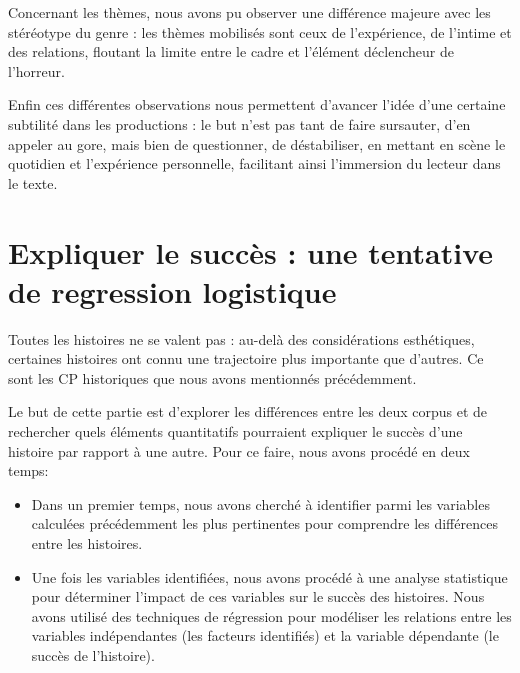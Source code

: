 \documentclass[12pt,a4paper,oneside,titlepage]{book} %
\begin{document}
\par Concernant les thèmes, nous avons pu observer une différence majeure avec les stéréotype du genre : les thèmes mobilisés sont ceux de l'expérience, de l'intime et des relations, floutant la limite entre le cadre et l'élément déclencheur de l'horreur.

\par Enfin ces différentes observations nous permettent d'avancer l'idée d'une certaine subtilité dans les productions : le but n'est pas tant de faire sursauter, d'en appeler au gore, mais bien de questionner, de déstabiliser, en mettant en scène le quotidien et l'expérience personnelle, facilitant ainsi l'immersion du lecteur dans le texte.


\chapter[Expliquer le succès]{Expliquer le succès : une tentative de regression logistique}

Toutes les histoires ne se valent pas : au-delà des considérations esthétiques, certaines histoires ont connu une trajectoire plus importante que d'autres. Ce sont les CP historiques que nous avons mentionnés précédemment.

Le but de cette partie est d'explorer les différences entre les deux corpus et de rechercher quels éléments quantitatifs pourraient expliquer le succès d'une histoire par rapport à une autre. Pour ce faire, nous avons procédé en deux temps:
\begin{itemize}
\item  Dans un premier temps, nous avons cherché à identifier parmi les variables calculées précédemment les plus pertinentes pour comprendre les différences entre les histoires. 

\item  Une fois les variables identifiées, nous avons procédé à une analyse statistique pour déterminer l'impact de ces variables sur le succès des histoires. Nous avons utilisé des techniques de régression pour modéliser les relations entre les variables indépendantes (les facteurs identifiés) et la variable dépendante (le succès de l'histoire). 
\end{itemize}
\end{document}
